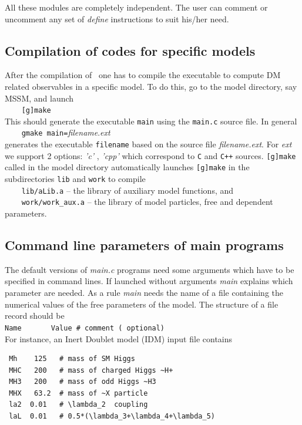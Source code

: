 \documentclass[12pt,a4paper]{article}
\begin{document}
All these modules are completely independent. The user can comment or
uncomment any set of {\it define} instructions to suit his/her need. 



\subsection{Compilation of codes for specific models}
 After the compilation of \micro\ one has to compile
the executable to compute DM related observables in a specific model. To
do this, go to the model directory, say MSSM,  and launch\\[2mm]
\verb|    [g]make|\\[2mm]
This should generate the executable {\tt main} using the {\tt main.c} source file. In
general\\[2mm]
\verb|    gmake main=|{\it filename}.{\it ext}\\[2mm]
generates the executable {\tt filename}  based on the source file {\it
filename.ext}.
For {\it ext}  we support 2 options: {\it 'c'} ,  {\it 'cpp'} which correspond to
{\tt C}  and {\tt C++} sources.
{\tt [g]make} called  in the model directory automatically  launches {\tt [g]make}
in the subdirectories {\tt lib} and {\tt work} to compile \\[2mm]
 \verb|    lib/aLib.a|   -- the library of auxiliary model functions, and \\
 \verb|    work/work_aux.a| -- the library of model particles, free and dependent parameters.\\
 

\subsection{Command line parameters of main programs}
\label{sec:command}
The default versions of {\it main.c}  programs need some arguments
which have to be specified in command lines. If launched without
arguments {\it main} explains which parameter are needed. 
As a rule  {\it main}  needs  the name of a file containing the
numerical values of the free parameters of the model. The structure of a file
record should be\\
\verb|Name       Value # comment ( optional)|\\

\noindent
For instance, an Inert Doublet model (IDM) input file contains
\begin{verbatim}
 Mh    125   # mass of SM Higgs 
 MHC   200   # mass of charged Higgs ~H+
 MH3   200   # mass of odd Higgs ~H3
 MHX   63.2  # mass of ~X particle
 la2  0.01   # \lambda_2  coupling
 laL  0.01   # 0.5*(\lambda_3+\lambda_4+\lambda_5)
\end{verbatim}
\end{document}
